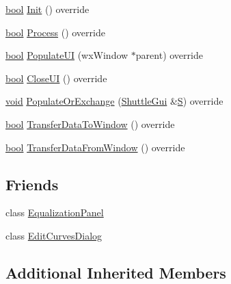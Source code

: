 \begin{DoxyCompactItemize}
\hyperlink{mac_2config_2i386_2lib-src_2libsoxr_2soxr-config_8h_abb452686968e48b67397da5f97445f5b}{bool} \hyperlink{class_effect_equalization_afa103d8e1331c9ee3b7bd12c779ec09f}{Init} () override
\item 
\hyperlink{mac_2config_2i386_2lib-src_2libsoxr_2soxr-config_8h_abb452686968e48b67397da5f97445f5b}{bool} \hyperlink{class_effect_equalization_a27bdb34a377680159997eeaeae1986ab}{Process} () override
\item 
\hyperlink{mac_2config_2i386_2lib-src_2libsoxr_2soxr-config_8h_abb452686968e48b67397da5f97445f5b}{bool} \hyperlink{class_effect_equalization_a0098acb678737d07cf4ca2d8f53f4617}{Populate\+UI} (wx\+Window $\ast$parent) override
\item 
\hyperlink{mac_2config_2i386_2lib-src_2libsoxr_2soxr-config_8h_abb452686968e48b67397da5f97445f5b}{bool} \hyperlink{class_effect_equalization_aaef7d61c6e7cdaa7cf59e99107660120}{Close\+UI} () override
\item 
\hyperlink{sound_8c_ae35f5844602719cf66324f4de2a658b3}{void} \hyperlink{class_effect_equalization_a276b0214475e309953c3677bd033750a}{Populate\+Or\+Exchange} (\hyperlink{class_shuttle_gui}{Shuttle\+Gui} \&\hyperlink{xlftab_8c_af933676109efed7ab34cea71d748a517}{S}) override
\item 
\hyperlink{mac_2config_2i386_2lib-src_2libsoxr_2soxr-config_8h_abb452686968e48b67397da5f97445f5b}{bool} \hyperlink{class_effect_equalization_a82051ea0ba3eaa408d2f83ef8e48fde8}{Transfer\+Data\+To\+Window} () override
\item 
\hyperlink{mac_2config_2i386_2lib-src_2libsoxr_2soxr-config_8h_abb452686968e48b67397da5f97445f5b}{bool} \hyperlink{class_effect_equalization_a5f6741452d8e743492b94bd529870887}{Transfer\+Data\+From\+Window} () override
\end{DoxyCompactItemize}
\subsection*{Friends}
\begin{DoxyCompactItemize}
\item 
class \hyperlink{class_effect_equalization_a2e4782c298f7e0f22608a5a5d5a55e69}{Equalization\+Panel}
\item 
class \hyperlink{class_effect_equalization_afc1f01b53a61ddd7729cd65b38057f41}{Edit\+Curves\+Dialog}
\end{DoxyCompactItemize}
\subsection*{Additional Inherited Members}


